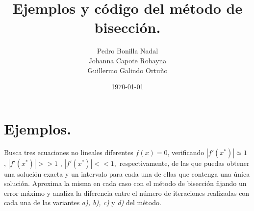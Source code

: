 \documentclass[11pt,a4paper]{article}
\title{Ejemplos y código del método de bisección.}
\author{Pedro Bonilla Nadal\\
  Johanna Capote Robayna\\
  Guillermo Galindo Ortuño}
\date{\today}
\begin{document}
\maketitle

\section{Ejemplos.} Busca tres ecuaciones no lineales diferentes $f (x) = 0$, verificando $ |f'(x^* )| \simeq 1$ , $ |f'(x^*)| >> 1$ , $ |f'(x^* )| << 1,$ respectivamente, de las que puedas obtener una solución exacta y un intervalo para cada una de ellas que contenga una única solución. Aproxima la misma en cada caso con el método de bisección fijando un error máximo y analiza la diferencia entre el número de iteraciones realizadas con cada una de las variantes \emph{a), b), c)} y \emph{d) }del método.\\
\end{document}
